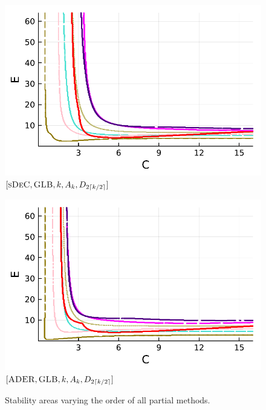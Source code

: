 \begin{figure}
\begin{minipage}[t]{0.32\textwidth}
		\includegraphics[width=\textwidth]{pdf/pdepics/diff/IMEXDeC_subtimesteps_gaussLobatto_all_2-8.pdf}
		\centering
		$[\textsc{sDeC},\textsc{GLB}, k, A_k,D_{2\lceil k/2 \rceil}]$
	\end{minipage}
	\begin{minipage}[t]{0.32\textwidth}
		\includegraphics[width=\textwidth]{pdf/pdepics/diff/IMEXADER_gaussLobatto_all_2-8.pdf}
		\centering
		$[\textsc{ADER},\textsc{GLB}, k, A_k,D_{2\lceil k/2 \rceil}]$
	\end{minipage}	
	\caption{Stability areas varying the order of all partial methods.}
	\label{fig: exa_difftermsim}
\end{figure}

